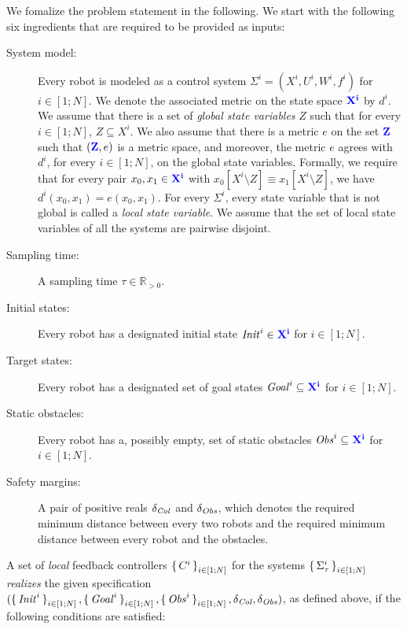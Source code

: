 We fomalize the problem statement in the following.
We start with the following six ingredients that are required to be provided as inputs:
\begin{description}
	\item[System model:] Every robot is modeled as a control system $\Sigma^i = (X^i, U^i, W^i, f^i)$ for $i\in [1;N]$. 
	We denote the associated metric on the state space ${\color{blue} \mathbf{X^i}}$ by $d^i$.
	We assume that there is a set of \emph{global state variables} $Z$ such that for every $i\in [1;N]$, $Z\subseteq X^i$.
	We also assume that there is a metric $e$ on the set ${\color{blue} \mathbf{Z}}$ such that $({\color{blue} \mathbf{Z}},e)$ is a metric space, and moreover, the metric $e$ agrees with $d^i$, for every $i\in [1;N]$, on the global state variables.
	Formally, we require that for every pair $x_0,x_1\in {\color{blue} \mathbf{X^i}}$ with $x_0[X^i\setminus Z]\equiv x_1[X^i\setminus Z]$, we have $d^i(x_0,x_1)=e(x_0,x_1)$.
	For every $\Sigma^i$, every state variable that is not global is called a \emph{local state variable}.
	We assume that the set of local state variables of all the systems are pairwise disjoint.
	\item[Sampling time:] A sampling time $\tau\in \mathbb{R}_{>0}$.
	\item[Initial states:] Every robot has a designated initial state $\mathit{Init}^i\in {\color{blue} \mathbf{X^i}}$ for $i\in [1;N]$.
	\item[Target states:] Every robot has a designated set of goal states $\mathit{Goal}^i\subseteq {\color{blue} \mathbf{X^i}}$  for $i\in [1;N]$.
	\item[Static obstacles:] Every robot has a, possibly empty, set of static obstacles $\mathit{Obs}^i\subseteq {\color{blue} \mathbf{X^i}}$  for $i\in [1;N]$.
	\item[Safety margins:] A pair of positive reals $\delta_{\mathit{Col}}$ and $\delta_{\mathit{Obs}}$, which denotes the required minimum distance between every two robots and the required minimum distance between every robot and the obstacles.
\end{description}

A set of \emph{local} feedback controllers $\set{C^i}_{i\in [1;N]}$ for the systems $\set{\Sigma_\tau^i}_{i\in [1;N]}$ \emph{realizes} the given specification $(\set{\mathit{Init}^i}_{i\in [1;N]}, \set{\mathit{Goal}^i}_{i\in [1;N]}, \set{\mathit{Obs}^i}_{i\in [1;N]}, \delta_{\mathit{Col}}, \delta_{\mathit{Obs}})$, as defined above, if the following conditions are satisfied:

